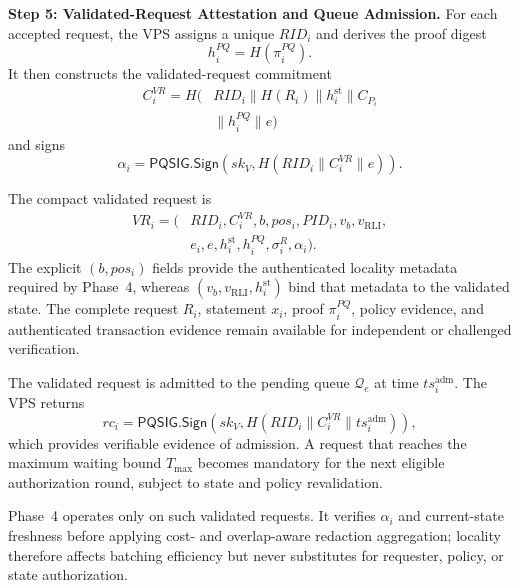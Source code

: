 \documentclass[lettersize,journal]{IEEEtran}
\begin{document}
\medskip
\noindent\textbf{Step 5: Validated-Request Attestation and Queue
Admission.}
For each accepted request, the VPS assigns a unique $RID_i$ and derives
the proof digest
\begin{equation}
h_i^{PQ}=H(\pi_i^{PQ}).
\end{equation}
It then constructs the validated-request commitment
\begin{equation}
\begin{aligned}
C_i^{VR}
=
H\big(&RID_i\parallel H(R_i)
\parallel h_i^{\mathrm{st}}
\parallel C_{P_i}\\
&\parallel h_i^{PQ}
\parallel e\big)
\end{aligned}
\end{equation}
and signs
\begin{equation}
\alpha_i=
\mathsf{PQSIG.Sign}
\left(
sk_V,
H(RID_i\parallel C_i^{VR}\parallel e)
\right).
\end{equation}

The compact validated request is
\begin{equation}
\begin{aligned}
VR_i=\big(&RID_i,C_i^{VR},b,pos_i,PID_i,
v_b,v_{\mathrm{RLI}},\\
&e_i,e,h_i^{\mathrm{st}},h_i^{PQ},
\sigma_i^R,\alpha_i\big).
\end{aligned}
\end{equation}
The explicit $(b,pos_i)$ fields provide the authenticated locality
metadata required by Phase~4, whereas
$(v_b,v_{\mathrm{RLI}},h_i^{\mathrm{st}})$ bind that metadata to the
validated state. The complete request $R_i$, statement $x_i$, proof
$\pi_i^{PQ}$, policy evidence, and authenticated transaction evidence
remain available for independent or challenged verification.

The validated request is admitted to the pending queue
$\mathcal{Q}_e$ at time $ts_i^{\mathrm{adm}}$. The VPS returns
\begin{equation}
rc_i=
\mathsf{PQSIG.Sign}
\left(
sk_V,
H(RID_i\parallel C_i^{VR}\parallel
ts_i^{\mathrm{adm}})
\right),
\end{equation}
which provides verifiable evidence of admission. A request that reaches
the maximum waiting bound $T_{\max}$ becomes mandatory for the next
eligible authorization round, subject to state and policy revalidation.

Phase~4 operates only on such validated requests. It verifies
$\alpha_i$ and current-state freshness before applying
cost- and overlap-aware redaction aggregation; locality therefore
affects batching efficiency but never substitutes for requester,
policy, or state authorization.
    
\end{document}
